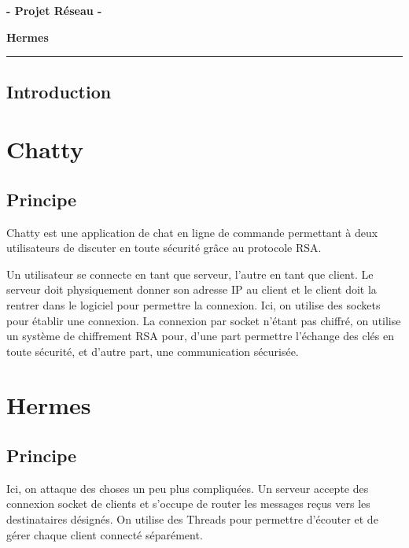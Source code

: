 \documentclass{article}
\begin{document}


\begin{center}
    \textbf{ - Projet Réseau - }

    \Large{\textbf{Hermes}}
\end{center}

\rule{\linewidth}{1.5pt}



\justify


\subsection{Introduction}

\section{Chatty}

\subsection{Principe}

Chatty est une application de chat en ligne de commande permettant à deux utilisateurs de discuter en toute sécurité grâce au protocole RSA. 

Un utilisateur se connecte en tant que serveur, l'autre en tant que client. 
Le serveur doit physiquement donner son adresse IP au client et le client doit la rentrer dans le logiciel pour 
permettre la connexion. Ici, on utilise des sockets pour établir une connexion. La connexion par socket n'étant pas chiffré, 
on utilise un système de chiffrement RSA pour, d'une part permettre l'échange des clés en toute sécurité, et d'autre part, 
une communication sécurisée. 




\section{Hermes}

\subsection{Principe}

Ici, on attaque des choses un peu plus compliquées. 
Un serveur accepte des connexion socket de clients et s'occupe de router les messages reçus vers les destinataires désignés. 
On utilise des Threads pour permettre d'écouter et de gérer chaque client connecté séparément. 
\end{document}
